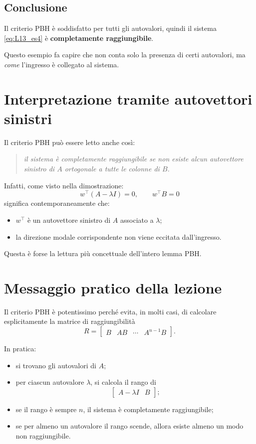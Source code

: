 \subsection*{Conclusione}

Il criterio PBH è soddisfatto per tutti gli autovalori, quindi il sistema \eqref{eq:L13_es4} è \textbf{completamente raggiungibile}.

\begin{osservazione}
Questo esempio fa capire che non conta solo la presenza di certi autovalori, ma \emph{come} l’ingresso è collegato al sistema.
\end{osservazione}

\section{Interpretazione tramite autovettori sinistri}

Il criterio PBH può essere letto anche così:

\begin{quote}
\emph{il sistema è completamente raggiungibile se non esiste alcun autovettore sinistro di \(A\) ortogonale a tutte le colonne di \(B\).}
\end{quote}

Infatti, come visto nella dimostrazione:
\[
w^\top(A-\lambda I)=0,
\qquad
w^\top B=0
\]
significa contemporaneamente che:
\begin{itemize}
    \item \(w^\top\) è un autovettore sinistro di \(A\) associato a \(\lambda\);
    \item la direzione modale corrispondente non viene eccitata dall’ingresso.
\end{itemize}

Questa è forse la lettura più concettuale dell’intero lemma PBH.

\section{Messaggio pratico della lezione}

Il criterio PBH è potentissimo perché evita, in molti casi, di calcolare esplicitamente la matrice di raggiungibilità
\[
R=\begin{bmatrix}
B & AB & \cdots & A^{n-1}B
\end{bmatrix}.
\]

In pratica:
\begin{itemize}
    \item si trovano gli autovalori di \(A\);
    \item per ciascun autovalore \(\lambda\), si calcola il rango di
    \[
    \begin{bmatrix}
    A-\lambda I & B
    \end{bmatrix};
    \]
    \item se il rango è sempre \(n\), il sistema è completamente raggiungibile;
    \item se per almeno un autovalore il rango scende, allora esiste almeno un modo non raggiungibile.
\end{itemize}

